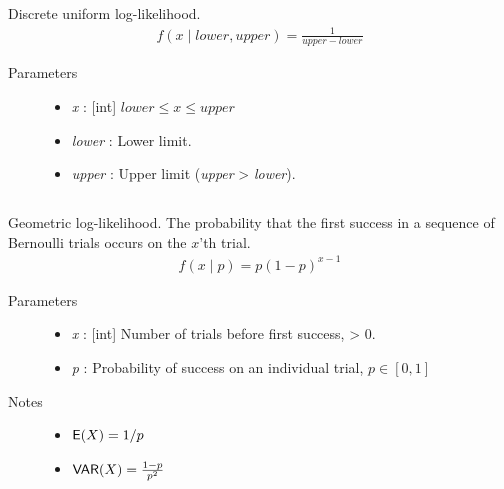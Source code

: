 \documentclass[]{jss}
\begin{document}
\subsection[discrete uniform]{}

Discrete uniform log-likelihood.
\begin{eqnarray*}
f(x \mid lower, upper) = \frac{1}{upper-lower}    
\end{eqnarray*}

\begin{description} 
\item[Parameters] \leavevmode\begin{itemize}
\item {} 
\emph{x} : {[}int{]} $lower \leq x \leq upper$

\item {} 
\emph{lower} : Lower limit.

\item {} 
\emph{upper} : Upper limit (\emph{upper} \textgreater{} \emph{lower}).

\end{itemize}

\end{description}

\subsection[geometric]{} 

Geometric log-likelihood. The probability that the first success in a
sequence of Bernoulli trials occurs on the $x$'th trial.
\begin{eqnarray*}
f(x \mid p) = p(1-p)^{x-1}    
\end{eqnarray*}
\begin{description}
\item[Parameters] \leavevmode\begin{itemize}
\item {} 
\emph{x} : {[}int{]} Number of trials before first success, \textgreater{} 0.

\item {} 
\emph{p} : Probability of success on an individual trial, $p \in [0,1]$

\end{itemize}

\item[Notes] \leavevmode\begin{itemize}
\item {} 
$\mathsf{E}(X)=1/p$

\item {} 
$\mathsf{VAR}(X)=\frac{1-p}{p^2}$
\end{itemize}

\end{description}
\end{document}
